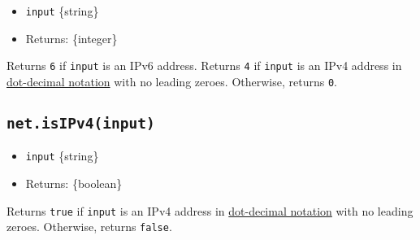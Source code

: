 \begin{itemize}
\tightlist
\item
  \texttt{input} \{string\}
\item
  Returns: \{integer\}
\end{itemize}

Returns \texttt{6} if \texttt{input} is an IPv6 address. Returns
\texttt{4} if \texttt{input} is an IPv4 address in
\href{https://en.wikipedia.org/wiki/Dot-decimal_notation}{dot-decimal
notation} with no leading zeroes. Otherwise, returns \texttt{0}.

\begin{Shaded}
\begin{Highlighting}[]
\NormalTok{(}\StringTok{\textquotesingle{}::1\textquotesingle{}}\NormalTok{)}\OperatorTok{;} 
\NormalTok{(}\NormalTok{)}\OperatorTok{;} 
\NormalTok{(}\NormalTok{)}\OperatorTok{;} 
\NormalTok{(}\NormalTok{)}\OperatorTok{;} 
\NormalTok{(}\NormalTok{)}\OperatorTok{;} 
\end{Highlighting}
\end{Shaded}

\subsection{\texorpdfstring{\texttt{net.isIPv4(input)}}{net.isIPv4(input)}}\label{net.isipv4input}

\begin{itemize}
\tightlist
\item
  \texttt{input} \{string\}
\item
  Returns: \{boolean\}
\end{itemize}

Returns \texttt{true} if \texttt{input} is an IPv4 address in
\href{https://en.wikipedia.org/wiki/Dot-decimal_notation}{dot-decimal
notation} with no leading zeroes. Otherwise, returns \texttt{false}.

